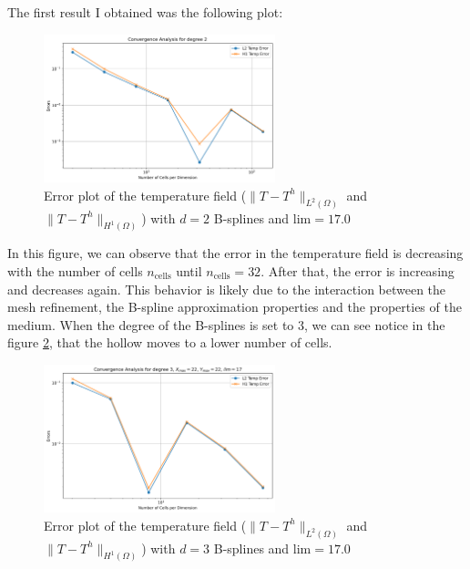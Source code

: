\documentclass[a4paper,12pt,twoside]{report}
\begin{document}
The first result I obtained was the following plot:
\begin{figure}[!h]
	\centering
	\includegraphics[width=0.6\textwidth]{figures/figures_thermoelas/Temp_X_max=22_Y_max=22_lim=17.0_d=2.png}
	\caption{Error plot of the temperature field ($\|T - T^h\|_{L^2(\Omega)}$ and $\|T - T^h\|_{H^1(\Omega)}$) with $d=2$ B-splines and $\text{lim} = 17.0$}
	\label{fig:error_temp_d2}
\end{figure}

In this figure, we can observe that the error in the temperature field is decreasing with the number of cells $n_{\text{cells}}$ until $n_{\text{cells}} = 32$. After that, the error is increasing and decreases again. This behavior is likely due to the interaction between the mesh refinement, the B-spline approximation properties and the properties of the medium. When the degree of the B-splines is set to 3, we can see notice in the figure \ref{fig:error_temp_d3}, that the hollow moves to a lower number of cells.

\begin{figure}[!h]
	\centering
	\includegraphics[width=0.6\textwidth]{figures/figures_thermoelas/Temp_X_max=22_Y_max=22_lim=17_d=3.png}
	\caption{Error plot of the temperature field ($\|T - T^h\|_{L^2(\Omega)}$ and $\|T - T^h\|_{H^1(\Omega)}$) with $d=3$ B-splines and $\text{lim} = 17.0$}
	\label{fig:error_temp_d3}
\end{figure}
\end{document}

